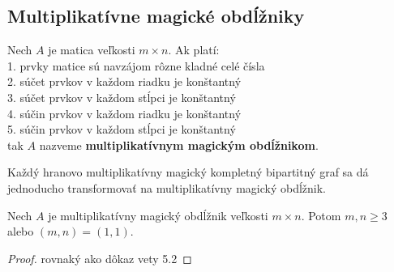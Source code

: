 \subsection{Multiplikatívne magické obdĺžniky}

\begin{subdefinition} Nech $A$ je matica veľkosti $m \times n$. Ak platí: \\
1. prvky matice sú navzájom rôzne kladné celé čísla \\
2. súčet prvkov v každom riadku je konštantný \\
3. súčet prvkov v každom stĺpci je konštantný \\
4. súčin prvkov v každom riadku je konštantný \\
5. súčin prvkov v každom stĺpci je konštantný \\
tak $A$ nazveme \textbf{multiplikatívnym magickým obdĺžnikom}.
\end{subdefinition} 

Každý hranovo multiplikatívny magický kompletný bipartitný graf sa dá jednoducho transformovať na multiplikatívny magický obdĺžnik. \\

\begin{subtheorem} Nech $A$ je multiplikatívny magický obdĺžnik veľkosti $m \times n$. Potom $m,n \geq 3$ alebo $(m, n) = (1, 1)$.
\end{subtheorem}

\begin{proof} rovnaký ako dôkaz vety 5.2
\end{proof}


